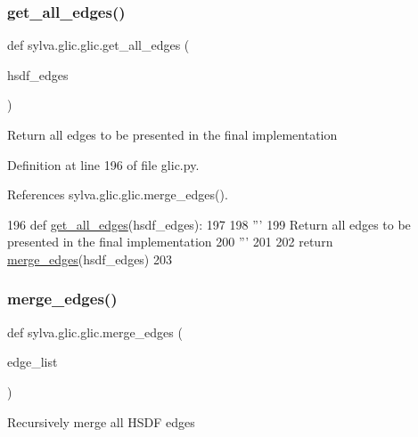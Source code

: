 \subsubsection{\texorpdfstring{get\+\_\+all\+\_\+edges()}{get\_all\_edges()}}
{\footnotesize\ttfamily def sylva.\+glic.\+glic.\+get\+\_\+all\+\_\+edges (\begin{DoxyParamCaption}\item[{}]{hsdf\+\_\+edges }\end{DoxyParamCaption})}

\begin{DoxyVerb}  Return all edges to be presented in the final implementation
\end{DoxyVerb}
 

Definition at line 196 of file glic.\+py.



References sylva.\+glic.\+glic.\+merge\+\_\+edges().


\begin{DoxyCode}
196 \textcolor{keyword}{def }\hyperlink{namespacesylva_1_1glic_1_1glic_a113a86d012f0236519ec7ac19e0e4850}{get\_all\_edges}(hsdf\_edges):
197 
198   \textcolor{stringliteral}{'''}
199 \textcolor{stringliteral}{    Return all edges to be presented in the final implementation}
200 \textcolor{stringliteral}{  '''}
201 
202   \textcolor{keywordflow}{return} \hyperlink{namespacesylva_1_1glic_1_1glic_aaac34d7c86749beb842e5be3f547d1ec}{merge\_edges}(hsdf\_edges)
203 
\end{DoxyCode}
\mbox{\label{namespacesylva_1_1glic_1_1glic_aaac34d7c86749beb842e5be3f547d1ec}} 
\subsubsection{\texorpdfstring{merge\+\_\+edges()}{merge\_edges()}}
{\footnotesize\ttfamily def sylva.\+glic.\+glic.\+merge\+\_\+edges (\begin{DoxyParamCaption}\item[{}]{edge\+\_\+list }\end{DoxyParamCaption})}

\begin{DoxyVerb}Recursively merge all HSDF edges \end{DoxyVerb}
 

